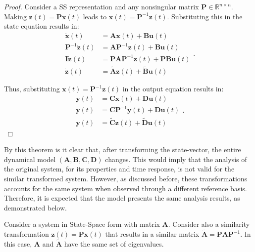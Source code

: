 \documentclass[a4paper,11pt]{book}
\numberwithin{figure}{chapter}
\numberwithin{equation}{chapter}
\numberwithin{table}{chapter}
\newtheorem{theorem}{Theorem}[chapter]
\theoremstyle{definition}
\newcounter{boxed-theorem}
\newenvironment{boxed-theorem}[1]
{\colorlet{shadecolor}{pastelBlue2!10} \begin{shaded} \begin{theorem}{#1}}
{\end{theorem} \end{shaded}}
\newcounter{boxed-definition}
\newcounter{boxed-example}
\begin{document}
\begin{proof}
    Consider a SS representation and any nonsingular matrix $\bm{P} \in \mathbb{R}^{n \times n}$. Making $\bm{z}(t) = \bm{P} \bm{x}(t)$ leads to $\bm{x}(t) = \bm{P}^{-1} \bm{z}(t)$. Substituting this in the state equation results in:
    \begin{equation}
    \begin{split}
        \dot{\bm{x}}(t) &= \bm{A} \bm{x}(t) + \bm{B} \bm{u}(t) \\
        \bm{P}^{-1} \dot{\bm{z}}(t) &= \bm{A} \bm{P}^{-1} \bm{z}(t) + \bm{B} \bm{u}(t) \\
        \bm{I} \dot{\bm{z}}(t) &= \bm{P} \bm{A} \bm{P}^{-1} \bm{z}(t) + \bm{P} \bm{B} \bm{u}(t) \\
        \dot{\bm{z}}(t) &= \tilde{\bm{A}} \bm{z}(t) + \tilde{\bm{B}} \bm{u}(t)
    \end{split}
    .\end{equation}
    
    Thus, substituting $\bm{x}(t) = \bm{P}^{-1} \bm{z}(t)$ in the output equation results in:
    \begin{equation}
    \begin{split}
        \bm{y}(t) &= \bm{C} \bm{x}(t) + \bm{D} \bm{u}(t) \\
        \bm{y}(t) &= \bm{C} \bm{P}^{-1} \bm{y}(t) + \bm{D} \bm{u}(t) \\
        \bm{y}(t) &= \tilde{\bm{C}} \bm{z}(t) + \tilde{\bm{D}} \bm{u}(t)
    \end{split}
    .\end{equation}
\end{proof}

By this theorem is it clear that, after transforming the state-vector, the entire dynamical model $(\bm{A}, \bm{B}, \bm{C}, \bm{D})$ changes. This would imply that the analysis of the original system, for its properties and time response, is not valid for the similar transformed system. However, as discussed before, these transformations accounts for the same system when observed through a different reference basis. Therefore, it is expected that the model presents the same analysis results, as demonstrated below.

\begin{boxed-theorem}{} \label{th:simTrans01}
    Consider a system in State-Space form with matrix $\bm{A}$. Consider also a similarity transformation $\bm{z}(t) = \bm{P} \bm{x}(t)$ that results in a similar matrix $\tilde{\bm{A}} = \bm{P} \bm{A} \bm{P}^{-1}$. In this case, $\bm{A}$ and $\tilde{\bm{A}}$ have the same set of eigenvalues.
\end{boxed-theorem}
\end{document}
